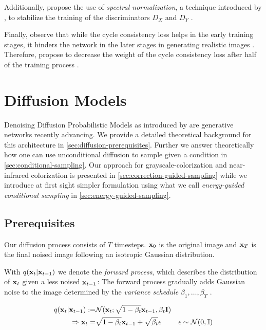 Additionally, \citeauthor*{mehri} propose the use of \textit{spectral normalization}, a technique introduced by , to stabilize the training of the discriminators $D_X$ and $D_Y$ \parencite{spectral-norm, mehri}.

Finally, \citeauthor*{mehri} observe that while the cycle consistency loss helps in the early training stages, it hinders the network in the later stages in generating realistic images \parencite{mehri}.
Therefore, \citeauthor*{mehri} propose to decrease the weight of the cycle consistency loss after half of the training process \parencite{mehri}.

\section{Diffusion Models}
Denoising Diffusion Probabilistic Models as introduced by \cite{ddpm} are generative networks recently advancing.
We provide a detailed theoretical background for this architecture in \autoref{sec:diffusion-prerequisites}.
Further we answer theoretically how one can use unconditional diffusion to sample given a condition in \autoref{sec:conditional-sampling}.
Our approach for grayscale-colorization and near-infrared colorization is presented in \autoref{sec:correction-guided-sampling} while
we introduce at first sight simpler formulation using what we call \textit{energy-guided conditional sampling} in \autoref{sec:energy-guided-sampling}.

\subsection{Prerequisites}
\label{sec:diffusion-prerequisites}
Our diffusion process consists of $T$ timesteps.
$\mathbf{x}_0$ is the original image and $\mathbf{x}_T$ is the final noised image following an isotropic Gaussian distribution.

With $q(\mathbf{x}_t | \mathbf{x}_{t-1})$ we denote the \textit{forward process}, which describes the distribution of $\mathbf{x}_t$ given a less noised $\mathbf{x}_{t-1}$:
The forward process gradually adds Gaussian noise to the image determined by the \textit{variance schedule} $\beta_1, \dots, \beta_T$ \parencite[\autoref{eqn:forward-process-definition}]{ddpm}.

\begin{equation}
   \label{eqn:forward-process-definition}
   \begin{aligned}
      q(\mathbf{x}_t | \mathbf{x}_{t-1}) := & \mathcal{N}(\mathbf{x}_t; \sqrt{1 - \beta_t}\mathbf{x}_{t-1}, \beta_t \mathbf{I})                                            \\
      \Rightarrow \mathbf{x}_t =            & \sqrt{1 - \beta_t}\mathbf{x}_{t-1} + \sqrt{\beta_t} \epsilon              & \epsilon \sim \mathcal{N}(0, \mathbb{I})
   \end{aligned}
\end{equation}

